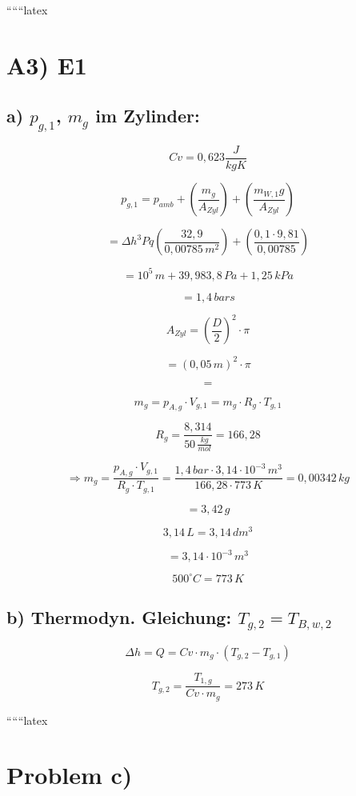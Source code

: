 
``````latex


\section*{A3) E1}

\subsection*{a) $p_{g,1}$, $m_g$ im Zylinder:}

\[
Cv = 0{,}623 \frac{J}{kgK}
\]

\[
p_{g,1} = p_{amb} + \left( \frac{m_g}{A_{Zyl}} \right) + \left( \frac{m_{W,1}g}{A_{Zyl}} \right)
\]

\[
= \Delta h^3 Pq \left( \frac{32{,}9}{0{,}00785 \, m^2} \right) + \left( \frac{0{,}1 \cdot 9{,}81}{0{,}00785} \right)
\]

\[
= 10^5 \, m + 39{,}983{,}8 \, Pa + 1{,}25 \, kPa
\]

\[
= 1{,}4 \, bars
\]

\[
A_{Zyl} = \left( \frac{D}{2} \right)^2 \cdot \pi
\]

\[
= (0{,}05 \, m)^2 \cdot \pi
\]

\[
=
\]

\[
m_g = p_{A,g} \cdot V_{g,1} = m_g \cdot R_g \cdot T_{g,1}
\]

\[
R_g = \frac{8{,}314}{50 \, \frac{kg}{mol}} = 166{,}28
\]

\[
\Rightarrow m_g = \frac{p_{A,g} \cdot V_{g,1}}{R_g \cdot T_{g,1}} = \frac{1{,}4 \, bar \cdot 3{,}14 \cdot 10^{-3} \, m^3}{166{,}28 \cdot 773 \, K} = 0{,}00342 \, kg
\]

\[
= 3{,}42 \, g
\]

\[
3{,}14 \, L = 3{,}14 \, dm^3
\]

\[
= 3{,}14 \cdot 10^{-3} \, m^3
\]

\[
500^\circ C = 773 \, K
\]

\subsection*{b) Thermodyn. Gleichung: $T_{g,2} = T_{B,w,2}$}

\[
\Delta h = Q = Cv \cdot m_g \cdot (T_{g,2} - T_{g,1})
\]

\[
T_{g,2} = \frac{T_{1,g}}{Cv \cdot m_g} = 273 \, K
\]

``````latex


\section*{Problem c)}

